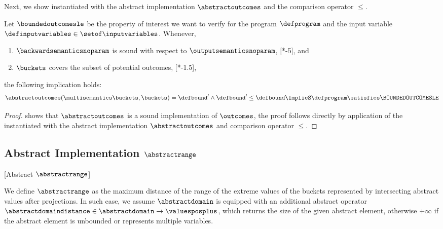 Next, we show  instantiated with the abstract implementation $\abstractoutcomes$ and the comparison operator $\le$.

\begin{theorem} 
  Let $\boundedoutcomesle$ be the property of interest we want to verify for the program $\defprogram$ and the input variable $\definputvariables\in\setof\inputvariables$.
  Whenever,
  \begin{enumerate}[label=(\roman*)]
    \item $\backwardsemanticsnoparam$ is sound with respect to $\outputsemanticsnoparam$, \cf{} [*-5], and
    \item $\buckets$ covers the subset of potential outcomes, \cf{} [*-1.5],
\end{enumerate}
  the following implication holds:
  \begin{align*}
    \abstractoutcomes(\multisemantics\buckets, \buckets) = \defbound' \land \defbound' \le \defbound \ImplieS \defprogram \satisfies \BOUNDEDOUTCOMESLE
  \end{align*}
\end{theorem}
\begin{proof}
   shows that $\abstractoutcomes$ is a sound implementation of $\outcomes$, the proof follows directly by application of the  instantiated with the abstract implementation $\abstractoutcomes$ and comparison operator $\le$.
\end{proof}

\subsection{Abstract Implementation \texorpdfstring{$\abstractrange$}{Abstract Range}}[Abstract \texorpdfstring{$\abstractrange$}{Range}]

We define $\abstractrange$ as the maximum distance of the range of the extreme values of the buckets represented by intersecting abstract values after projections.
In such case, we assume $\abstractdomain$ is equipped with an additional abstract operator $\abstractdomaindistance\in\abstractdomain\to\valuesposplus$, which returns the size of the given abstract element, otherwise $+\infty$ if the abstract element is unbounded or represents multiple variables.

